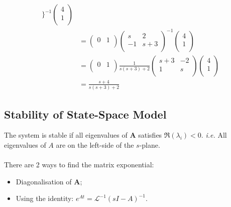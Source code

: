 \begin{itemize}
\begin{ex}{}
\begin{equation*}
\begin{aligned}
        \}^{-1}
        \begin{pmatrix}
        4\\
        1\\
        \end{pmatrix}\\
        &=\begin{pmatrix}
         0 & 1\\
        \end{pmatrix}
        \begin{pmatrix}
        s&2\\
        -1&s+3\\
        \end{pmatrix}
        ^{-1}
        \begin{pmatrix}
        4\\
        1\\
        \end{pmatrix}\\
        &=\begin{pmatrix}
         0 & 1\\
        \end{pmatrix}
        \frac{1}{s(s+3)+2}
        \begin{pmatrix}
        s+3&-2\\
        1&s\\
        \end{pmatrix}
        \begin{pmatrix}
        4\\
        1\\
        \end{pmatrix}\\
        &= \frac{s+4}{s(s+3)+2}
        \end{aligned}
        \end{equation*}
    \end{ex}
\end{itemize}


\subsection{Stability of State-Space Model}
The system is stable if all eigenvalues of $\mathbf{A}$ satisfies $\Re(\lambda_{i})<0$. \textit{i.e.} All eigenvalues of $A$ are on the left-side of the $s$-plane.\\\\
There are 2 ways to find the matrix exponential:
\begin{itemize}
    \item Diagonalisation of $\mathbf{A}$;
    \item Using the identity: $e^{At} = \mathcal{L}^{-1}(sI-A)^{-1}$.
\end{itemize}


